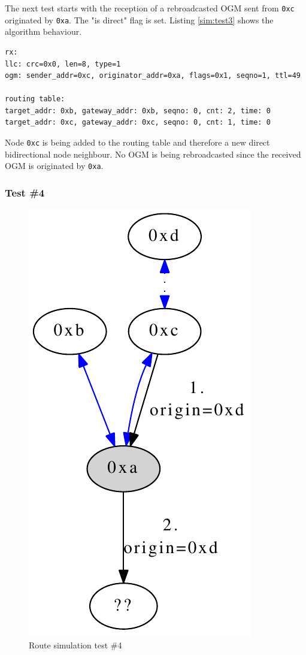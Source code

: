 The next test starts with the reception of a rebroadcasted OGM sent from \texttt{0xc} originated by \texttt{0xa}. The "is direct" flag is set. Listing \ref{sim:test3} shows the algorithm behaviour.

\begin{lstlisting}[label=sim:test3,caption=Output of Test \#3]
rx:
llc: crc=0x0, len=8, type=1
ogm: sender_addr=0xc, originator_addr=0xa, flags=0x1, seqno=1, ttl=49

routing table: 
target_addr: 0xb, gateway_addr: 0xb, seqno: 0, cnt: 2, time: 0
target_addr: 0xc, gateway_addr: 0xc, seqno: 0, cnt: 1, time: 0
\end{lstlisting}

Node \texttt{0xc} is being added to the routing table and therefore a new direct bidirectional node neighbour. No OGM is being rebroadcasted since the received OGM is originated by \texttt{0xa}.

\subsubsection{Test \#4}%
\begin{figure}[H]
  \begin{center}
    \includegraphics[]{figures/test4}
  \end{center}
  \caption{Route simulation test \#4}
\end{figure}

